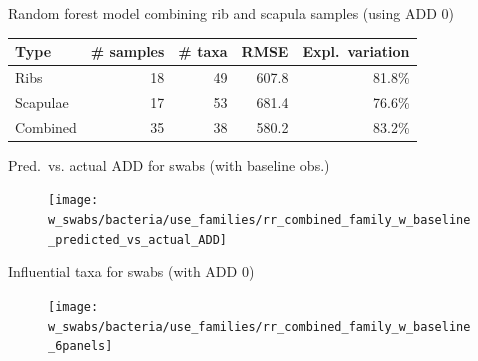 \documentclass{beamer}
\begin{document}
\begin{frame}{Random forest model combining rib and scapula samples (using ADD 0)}

  \begin{tabular}{lrrrr}
    Type & \# samples & \# taxa & RMSE & Expl.\ variation\\ \hline
    Ribs & 18 & 49 & 607.8 & 81.8\% \\
    Scapulae & 17 & 53 & 681.4 & 76.6\% \\
    Combined & 35 & 38 & 580.2 & 83.2\%
  \end{tabular}
  
  \vspace{0.1in}

\end{frame}


\begin{frame}{Pred.\ vs. actual ADD for swabs (with baseline obs.)}

  \begin{center}
    \begin{figure}
      \texttt{[image: w\_swabs/bacteria/use\_families/rr\_combined\_family\_w\_baseline\_predicted\_vs\_actual\_ADD]}
    \end{figure}
  \end{center}

\end{frame}



\begin{frame}{Influential taxa for swabs (with ADD 0)}

  \begin{center}
    \begin{figure}
      \texttt{[image: w\_swabs/bacteria/use\_families/rr\_combined\_family\_w\_baseline\_6panels]}
    \end{figure}
  \end{center}

\end{frame}
\end{document}
